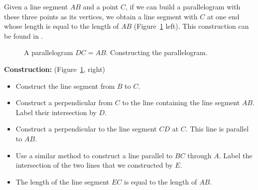 Given a line segment $AB$ and a point $C$, if we can build a parallelogram with these three points as its vertices, we obtain a line segment with $C$ at one end whose length is equal to the length of $AB$ (Figure~\ref{fig.parallel-1} left). This construction can be found in \cite[pp. 207--208]{roads}.
\begin{figure}[H]
\begin{center}
\caption{A parallelogram $DC=AB$. Constructing the parallelogram.}\label{fig.parallel-1}
\end{center}
\end{figure}
\vspace*{-4ex}
\textbf{Construction:} (Figure~\ref{fig.parallel-1}, right)
\begin{itemize}
\item Construct the line segment from $B$ to $C$.
\item Construct a perpendicular from $C$ to the line containing the line segment $AB$. Label their intersection by $D$.
\item Construct a perpendicular to the line segment $CD$ at $C$. This line is parallel to $AB$.
\item Use a similar method to construct a line parallel to $BC$ through $A$. Label the intersection of the two lines that we constructed by $E$.
\item The length of the line segment $EC$ is equal to the length of $AB$.
\end{itemize}
